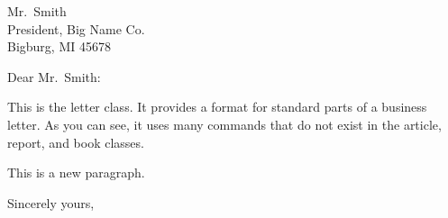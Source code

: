 \documentclass[12pt]{letter}               %
\begin{document}
 
\begin{letter}{Mr.~Smith\\ President,      %
   Big Name Co.\\Bigburg, MI 45678}        %
\opening{Dear Mr.~Smith:}                  %
 
This is the letter class.  It provides a format for standard parts
of a business letter.  As you can see, it uses many commands that
do not exist in the article, report, and book classes.
 
This is a new paragraph.
 
\closing{Sincerely yours,}                 %
  
\end{letter}                               %
\end{document}
